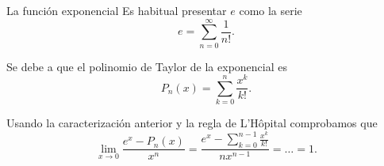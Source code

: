\begin{frame}{La función exponencial}
  Es habitual presentar $e$ como la serie
  \[
    e = \sum_{n=0}^\infty \frac{1}{n!}.
  \]

  Se debe a que el polinomio de Taylor de la exponencial es
  \[
    P_n(x) = \sum_{k=0}^n \frac{x^k}{k!}.
  \]

  Usando la caracterización anterior y la regla de L'Hôpital comprobamos
  que
  \[
    \lim_{x \to 0} \frac{e^x - P_n(x)}{x^n}
    = \frac{e^x - \sum_{k = 0}^{n - 1} \frac{x^k}{k!}}{nx^{n - 1}}
    = \ldots = 1.
  \]
\end{frame}
